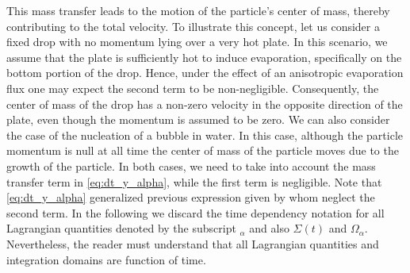 This mass transfer leads to the motion of the particle's center of mass, thereby contributing to the total velocity.
To illustrate this concept, let us consider a fixed drop with no momentum lying over a very hot plate.
In this scenario, we assume that the plate is sufficiently hot to induce evaporation, specifically on the bottom portion of the drop.
Hence, under the effect of an anisotropic evaporation flux one may expect the second term to be non-negligible.
Consequently, the center of mass of the drop has a non-zero velocity in the opposite direction of the plate, even though the momentum is assumed to be zero.
We can also consider the case of the nucleation of a bubble in water. 
In this case, although the particle momentum is null at all time the center of mass of the particle moves due to the growth of the particle. 
In both cases, we need to take into account the mass transfer term in \ref{eq:dt_y_alpha}, while the first term is negligible. 
Note that \ref{eq:dt_y_alpha} generalized previous expression given by \citet{morel2015mathematical} whom neglect the second term.
In the following we discard the time dependency notation for all Lagrangian quantities denoted by the subscript $_\alpha$ and also $\Sigma(t)$ and $\Omega_\alpha$.
Nevertheless, the reader must understand that all Lagrangian quantities and integration domains are function of time. 

